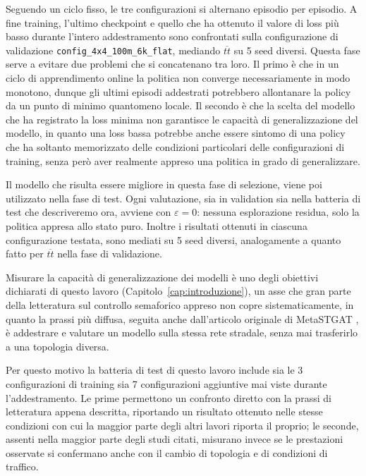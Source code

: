Seguendo un ciclo fisso, le tre configurazioni si alternano episodio per
episodio. A fine training, l'ultimo checkpoint e quello che ha ottenuto il
valore di loss più basso durante l'intero addestramento sono confrontati
sulla configurazione di validazione \texttt{config\_4x4\_100m\_6k\_flat},
mediando $\overline{tt}$ su 5 seed diversi.
Questa fase serve a evitare due problemi che si concatenano tra loro.
Il primo è che in un ciclo di
apprendimento online la politica non converge necessariamente in modo
monotono, dunque gli ultimi episodi addestrati potrebbero allontanare la policy da un
punto di minimo quantomeno locale.
Il secondo è che la scelta del modello che ha registrato la loss minima non garantisce
le capacità di generalizzazione del modello, in quanto una loss bassa potrebbe
anche essere sintomo di una policy che ha soltanto memorizzato delle condizioni particolari delle
configurazioni di training, senza però aver realmente appreso una politica in grado di generalizzare.

Il modello che risulta essere migliore in questa fase di selezione, viene poi utilizzato nella fase di test.
Ogni valutazione, sia in validation sia nella batteria di test che descriveremo ora, avviene con $\varepsilon=0$:
nessuna esplorazione residua, solo la politica appresa allo stato puro. Inoltre i risultati ottenuti in ciascuna
configurazione testata, sono mediati su 5 seed diversi, analogamente a quanto fatto per $\overline{tt}$ nella fase di validazione.

Misurare la capacità di generalizzazione dei modelli è uno degli obiettivi
dichiarati di questo lavoro (Capitolo~\ref{cap:introduzione}), un asse che
gran parte della letteratura sul controllo semaforico appreso non copre
sistematicamente, in quanto la prassi più diffusa, seguita anche dall'articolo
originale di MetaSTGAT \citep{wang2022metastgat}, è addestrare e valutare un modello sulla stessa
rete stradale, senza mai trasferirlo a una topologia diversa.

Per questo motivo la batteria di test di questo lavoro include sia le 3
configurazioni di training sia 7 configurazioni aggiuntive mai viste
durante l'addestramento. Le prime permettono un confronto diretto con la
prassi di letteratura appena descritta, riportando un risultato ottenuto
nelle stesse condizioni con cui la maggior parte degli altri lavori
riporta il proprio; le seconde, assenti nella maggior parte degli studi
citati, misurano invece se le prestazioni osservate si confermano anche con il cambio
di topologia e di condizioni di traffico.

